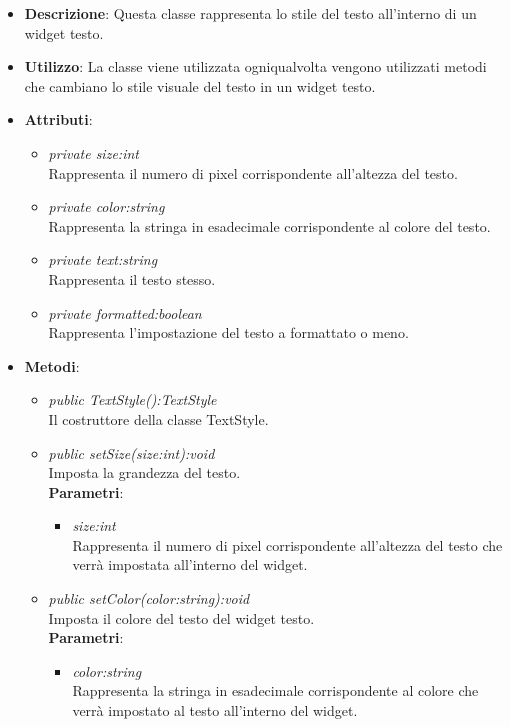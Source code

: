 \begin{itemize}
\item \textbf{Descrizione}: Questa classe rappresenta lo stile del testo all'interno di un widget testo.
\item \textbf{Utilizzo}: La classe viene utilizzata ogniqualvolta vengono utilizzati metodi che cambiano lo stile visuale del testo in un widget testo.
\item \textbf{Attributi}:
	\begin{itemize}
	\item \textit{private size:int}\\
	Rappresenta il numero di pixel corrispondente all'altezza del testo.
	\item \textit{private color:string}\\
	Rappresenta la stringa in esadecimale corrispondente al colore del testo.
	\item \textit{private text:string}\\
	Rappresenta il testo stesso. 
	\item \textit{private formatted:boolean}\\
	Rappresenta l'impostazione del testo a formattato o meno.
	\end{itemize}
\item \textbf{Metodi}:
	\begin{itemize}
	\item \textit{public TextStyle():TextStyle}\\
	Il costruttore della classe TextStyle.
	\item \textit{public setSize(size:int):void}\\
	Imposta la grandezza del testo.
		\\ \textbf{Parametri}: \begin{itemize}
		\item \textit{size:int}\\
		Rappresenta il numero di pixel corrispondente all'altezza del testo che verrà impostata all'interno del widget.
		\end{itemize} 
	\item \textit{public setColor(color:string):void}\\
	Imposta il colore del testo del widget testo.
		\\ \textbf{Parametri}: \begin{itemize}
		\item \textit{color:string}\\
		Rappresenta la stringa in esadecimale corrispondente al colore che verrà impostato al testo all'interno del widget.

\end{itemize}
\end{itemize}
\end{itemize}
